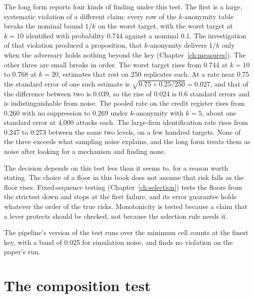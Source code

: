 The long form reports four kinds of finding under this test. The first is a large,
systematic violation of a different claim: every row of the $k$-anonymity table
breaks the nominal bound $1/k$ on the worst target, with the worst target at
$k = 10$ identified with probability 0.744 against a nominal 0.1.
The investigation of that violation produced a proposition, that $k$-anonymity
delivers $1/k$ only when the adversary holds nothing beyond the key
(Chapter~\ref{ch:measures}). The other three are small breaks in order. The worst
target rises from 0.744 at $k = 10$ to 0.768 at $k = 20$, estimates that rest on 250
replicates each. At a rate near 0.75 the standard error of one such estimate is
$\sqrt{0.75 \times 0.25/250} = 0.027$, and that of the difference between two is 0.039,
so the rise of 0.024 is 0.6 standard errors and is indistinguishable from noise. %
The pooled rate on the credit register rises from 0.260 with no suppression to
0.269 under $k$-anonymity with $k = 5$, about one standard error at 4{,}000 attacks
each. %
The large-firm identification rate rises from 0.247 to 0.273 between the same two
levels, on a few hundred targets. %
None of the three exceeds what sampling noise explains, and the long form treats
them as noise after looking for a mechanism and finding none.

The decision depends on this test less than it seems to, for a reason worth stating.
The choice of a floor in this book does not assume that risk falls as the floor
rises. Fixed-sequence testing (Chapter~\ref{ch:selection}) tests the floors from the
strictest down and stops at the first failure, and its error guarantee holds
whatever the order of the true risks. Monotonicity is tested because a claim that a
lever protects should be checked, not because the selection rule needs it.

The pipeline's version of the test runs over the minimum cell counts at the finest
key, with a band of 0.025 for simulation noise, and finds no violation on the paper's
run. %

\section{The composition test}

